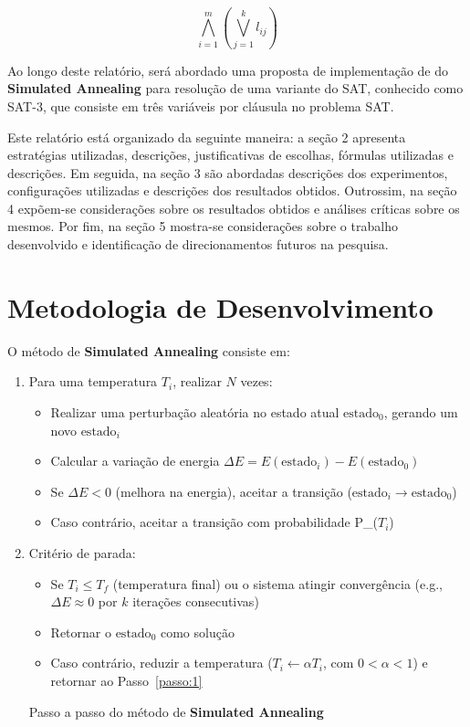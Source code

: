 \documentclass[12pt]{article}
\begin{document}
\begin{equation}
\bigwedge_{i=1}^{m} \left( \bigvee_{j=1}^{k} l_{ij} \right)
\end{equation}

Ao longo deste relatório, será abordado uma proposta de implementação de do \textbf{Simulated Annealing} para resolução de uma variante do SAT, conhecido como SAT-3, que consiste em três variáveis por cláusula no problema SAT.

Este relatório está organizado da seguinte maneira: a seção 2 apresenta estratégias utilizadas, descrições, justificativas de escolhas, fórmulas utilizadas e descrições. Em seguida, na seção 3 são abordadas descrições dos experimentos, configurações utilizadas e descrições dos resultados obtidos. Outrossim, na seção 4 expõem-se considerações sobre os resultados obtidos e análises críticas sobre os mesmos. Por fim, na seção 5 mostra-se considerações sobre o trabalho desenvolvido e identificação de direcionamentos futuros na pesquisa.



\section{Metodologia de Desenvolvimento} \label{sec:firstpage}

O método de \textbf{Simulated Annealing} consiste em:
\begin{enumerate}
  
  \item Para uma temperatura $T_i$, realizar $N$ vezes: \label{passo:1}
  \begin{itemize}
    \item Realizar uma perturbação aleatória no estado atual $\text{estado}_0$, gerando um novo $\text{estado}_i$
    \item Calcular a variação de energia $\Delta E = E(\text{estado}_i) - E(\text{estado}_0)$
    \item Se $\Delta E < 0$ (melhora na energia), aceitar a transição ($\text{estado}_i \rightarrow \text{estado}_0$)
    \item Caso contrário, aceitar a transição com probabilidade P_{}($T_i$)
  \end{itemize}
  
  \item Critério de parada:
  \begin{itemize}
    \item Se $T_i \leq T_f$ (temperatura final) ou o sistema atingir convergência (e.g., $\Delta E \approx 0$ por $k$ iterações consecutivas)
    \item Retornar o $\text{estado}_0$ como solução
    \item Caso contrário, reduzir a temperatura ($T_i \leftarrow \alpha T_i$, com $0 < \alpha < 1$) e retornar ao Passo~\ref{passo:1}
  \end{itemize}
  \label{pseudocodigo}
  \caption{Passo a passo do método de \textbf{Simulated Annealing}}
\end{enumerate} 
\end{document}

